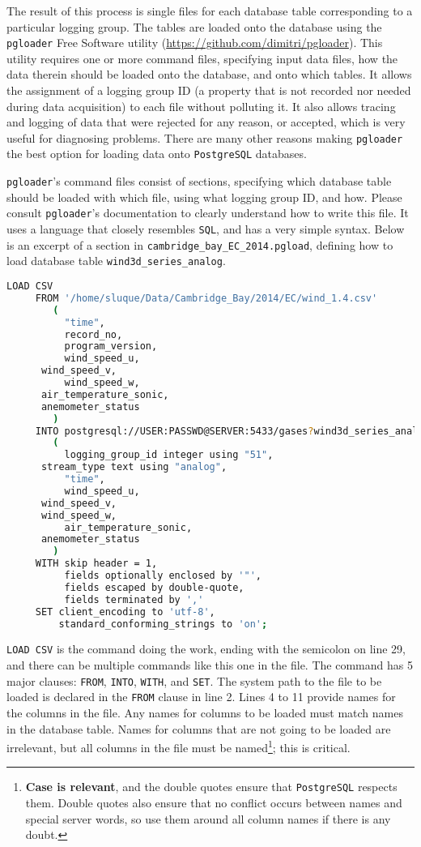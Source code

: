 \documentclass[12pt,letterpaper,titlepage,headings=small,numbers=noenddot]%
{scrartcl}
\begin{document}
The result of this process is single files for each database table
corresponding to a particular logging group.  The tables are loaded onto
the database using the \texttt{pgloader} Free Software utility
(\url{https://github.com/dimitri/pgloader}).  This utility requires one or
more command files, specifying input data files, how the data therein
should be loaded onto the database, and onto which tables.  It allows the
assignment of a logging group ID (a property that is not recorded nor
needed during data acquisition) to each file without polluting it.  It also
allows tracing and logging of data that were rejected for any reason, or
accepted, which is very useful for diagnosing problems.  There are many
other reasons making \texttt{pgloader} the best option for loading data
onto \texttt{PostgreSQL} databases.

\texttt{pgloader}'s command files consist of sections, specifying which
database table should be loaded with which file, using what logging group
ID, and how.  Please consult \texttt{pgloader}'s documentation to clearly
understand how to write this file.  It uses a language that closely
resembles \texttt{SQL}, and has a very simple syntax.  Below is an excerpt
of a section in \texttt{cambridge\_bay\_EC\_2014.pgload}, defining how to
load database table \texttt{wind3d\_series\_analog}.

\begin{lstlisting}[language=bash, basicstyle=\footnotesize \ttfamily, frame=single, showstringspaces=false]
LOAD CSV
     FROM '/home/sluque/Data/Cambridge_Bay/2014/EC/wind_1.4.csv'
        (
          "time",
          record_no,
          program_version,
          wind_speed_u,
	  wind_speed_v,
          wind_speed_w,
	  air_temperature_sonic,
	  anemometer_status
        )
     INTO postgresql://USER:PASSWD@SERVER:5433/gases?wind3d_series_analog
        (
          logging_group_id integer using "51",
	  stream_type text using "analog",
          "time",
          wind_speed_u,
	  wind_speed_v,
	  wind_speed_w,
          air_temperature_sonic,
	  anemometer_status
        )
     WITH skip header = 1,
          fields optionally enclosed by '"',
          fields escaped by double-quote,
          fields terminated by ','
     SET client_encoding to 'utf-8',
         standard_conforming_strings to 'on';
\end{lstlisting}

\texttt{LOAD CSV} is the command doing the work, ending with the semicolon
on line 29, and there can be multiple commands like this one in the file.
The command has 5 major clauses: \texttt{FROM}, \texttt{INTO},
\texttt{WITH}, and \texttt{SET}.  The system path to the file to be loaded
is declared in the \texttt{FROM} clause in line 2.  Lines 4 to 11 provide
names for the columns in the file.  Any names for columns to be loaded must
match names in the database table.  Names for columns that are not going to
be loaded are irrelevant, but all columns in the file must be
named\footnote{\textbf{Case is relevant}, and the double quotes ensure that
  \texttt{PostgreSQL} respects them.  Double quotes also ensure that no
  conflict occurs between names and special server words, so use them
  around all column names if there is any doubt.}; this is critical.
\end{document}
